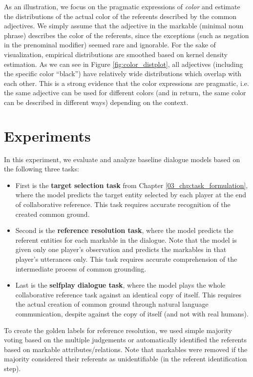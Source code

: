 As an illustration, we focus on the pragmatic expressions of \textit{color} and estimate the distributions of the actual color of the referents described by the common adjectives. We simply assume that the adjective in the markable (minimal noun phrase) describes the color of the referents, since the exceptions (such as negation in the prenominal modifier) seemed rare and ignorable. For the sake of visualization, empirical distributions are smoothed based on kernel density estimation. As we can see in Figure \ref{fig:color_distplot}, all adjectives (including the specific color ``black'') have relatively wide distributions which overlap with each other. This is a strong evidence that the color expressions are pragmatic, i.e. the same adjective can be used for different colors (and in return, the same color can be described in different ways) depending on the context.


\section{Experiments}
\label{04_sec:experiments}

In this experiment, we evaluate and analyze baseline dialogue models based on the following three tasks: 

\begin{itemize}
  \item First is the \textbf{target selection task} from Chapter \ref{03_chp:task_formulation}, where the model predicts the target entity selected by each player at the end of collaborative reference. This task requires accurate recognition of the created common ground.
  \item Second is the \textbf{reference resolution task}, where the model predicts the referent entities for each markable in the dialogue. Note that the model is given only one player's observation and predicts the markables in that player's utterances only. This task requires accurate comprehension of the intermediate process of common grounding.
  \item Last is the \textbf{selfplay dialogue task}, where the model plays the whole collaborative reference task against an identical copy of itself. This requires the actual creation of common ground through natural language communication, despite against the copy of itself (and not with real humans).
\end{itemize}

To create the golden labels for reference resolution, we used simple majority voting based on the multiple judgements or automatically identified the referents based on markable attributes/relations. Note that markables were removed if the majority considered their referents as unidentifiable (in the referent identification step).


